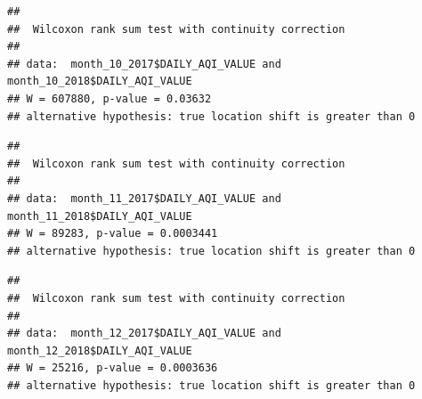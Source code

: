 \documentclass[12pt,]{article}
\newenvironment{Shaded}{\begin{snugshade}}{\end{snugshade}}
\newcommand{\KeywordTok}[1]{\textcolor[rgb]{0.13,0.29,0.53}{\textbf{#1}}}
\newcommand{\DataTypeTok}[1]{\textcolor[rgb]{0.13,0.29,0.53}{#1}}
\newcommand{\DecValTok}[1]{\textcolor[rgb]{0.00,0.00,0.81}{#1}}
\newcommand{\StringTok}[1]{\textcolor[rgb]{0.31,0.60,0.02}{#1}}
\newcommand{\OperatorTok}[1]{\textcolor[rgb]{0.81,0.36,0.00}{\textbf{#1}}}
\newcommand{\NormalTok}[1]{#1}
\begin{document}
\begin{Shaded}
\end{Shaded}

\begin{verbatim}
## 
##  Wilcoxon rank sum test with continuity correction
## 
## data:  month_10_2017$DAILY_AQI_VALUE and month_10_2018$DAILY_AQI_VALUE
## W = 607880, p-value = 0.03632
## alternative hypothesis: true location shift is greater than 0
\end{verbatim}

\begin{Shaded}
\end{Shaded}

\begin{verbatim}
## 
##  Wilcoxon rank sum test with continuity correction
## 
## data:  month_11_2017$DAILY_AQI_VALUE and month_11_2018$DAILY_AQI_VALUE
## W = 89283, p-value = 0.0003441
## alternative hypothesis: true location shift is greater than 0
\end{verbatim}

\begin{Shaded}
\end{Shaded}

\begin{verbatim}
## 
##  Wilcoxon rank sum test with continuity correction
## 
## data:  month_12_2017$DAILY_AQI_VALUE and month_12_2018$DAILY_AQI_VALUE
## W = 25216, p-value = 0.0003636
## alternative hypothesis: true location shift is greater than 0
\end{verbatim}
\end{document}
